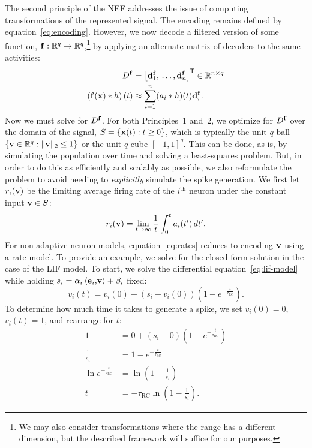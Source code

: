 The second principle of the NEF addresses the issue of computing transformations of the represented signal.
The encoding remains defined by equation~\ref{eq:encoding}.
However, we now decode a filtered version of some function, $\mathbf{f} : \mathbb{R}^q \rightarrow \mathbb{R}^q$,\footnote{
We may also consider transformations where the range has a different dimension, but the described framework will suffice for our purposes.}
by applying an alternate matrix of decoders to the same activities:
\begin{equation} \label{eq:trans-decode}
\begin{aligned}
D^{\mathbf{f}} &= {\left[ \mathbf{d}^{\mathbf{f}}_1\text{,}\, \ldots\text{,}\, \mathbf{d}^{\mathbf{f}}_n \right]}^\mathsf{T} \in \mathbb{R}^{n \times q} \\
\left( \mathbf{f}(\mathbf{x}) \ast h \right)(t) &\approx \sum_{i=1}^n (a_i \ast h)(t) \mathbf{d}^{\mathbf{f}}_i \text{.}
\end{aligned}
\end{equation}
Now we must solve for $D^{\mathbf{f}}$. For both Principles~1 and~2, we optimize for $D^{\mathbf{f}}$ over the domain of the signal, $S = \{\mathbf{x}(t) : t \ge 0\}$, which is typically the unit $q$-ball $\{ \mathbf{v} \in \mathbb{R}^q : \|\mathbf{v}\|_2 \le 1\}$ or the unit $q$-cube $[-1\text{,}\, 1]^q$.
This can be done, as is, by simulating the population over time and solving a least-squares problem.
But, in order to do this as efficiently and scalably as possible, we also reformulate the problem to avoid needing to \emph{explicitly} simulate the spike generation.
We first let $r_i(\mathbf{v})$ be the limiting average firing rate of the $i^{\text{th}}$ neuron under the constant input $\mathbf{v} \in S$:
\begin{equation} \label{eq:rates}
r_i(\mathbf{v}) = \lim_{t \rightarrow \infty} \frac{1}{t} \int_{0}^t a_i(t') \, dt' \text{.}
\end{equation}
For non-adaptive neuron models, equation~\ref{eq:rates} reduces to encoding $\mathbf{v}$ using a rate model.
To provide an example, we solve for the closed-form solution in the case of the LIF model. To start, we solve the differential equation~\ref{eq:lif-model} while holding $s_i = \alpha_i \left \langle \mathbf{e}_i \text{,} \mathbf{v} \right \rangle + \beta_i$ fixed:
\begin{equation*}
v_i(t) = v_i(0) + \left( s_i - v_i(0) \right) \left(1 - e^{-\frac{t}{\tau_\text{RC}}} \right) \text{.}
\end{equation*}
To determine how much time it takes to generate a spike, we set $v_i(0) = 0$, $v_i(t) = 1$, and rearrange for $t$:
\begin{align*}
1 &= 0 + \left( s_i - 0 \right) \left(1 - e^{-\frac{t}{\tau_\text{RC}}} \right) \\
\frac{1}{s_i} &= 1 - e^{-\frac{t}{\tau_\text{RC}}} \\
\ln e^{-\frac{t}{\tau_\text{RC}}} &= \ln \left( 1 - \frac{1}{s_i} \right) \\
t &= -\tau_\text{RC} \ln \left( 1 - \frac{1}{s_i} \right) \text{.}
\end{align*}

